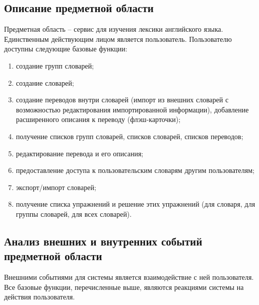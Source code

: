 \documentclass[a4paper,14pt]{extarticle}
\begin{document}
\subsection{Описание предметной области}
Предметная область -- сервис для изучения лексики английского языка.
Единственным действующим лицом является пользователь. Пользователю доступны
следующие базовые функции:
\begin{enumerate}
    \item создание групп словарей;
    \item создание словарей;
    \item создание переводов внутри словарей (импорт из внешних словарей с
          возможностью редактирования импортированной информации), добавление
          расширенного описания к переводу (флэш-карточки);
    \item получение списков групп словарей, списков словарей, списков переводов;
    \item редактирование перевода и его описания;
    \item предоставление доступа к пользовательским словарям другим пользователям;
    \item экспорт/импорт словарей;
    \item получение списка упражнений и решение этих упражнений (для словаря,
          для группы словарей, для всех словарей).
\end{enumerate}

\subsection{Анализ внешних и внутренних событий предметной области}
Внешними событиями для системы является взаимодействие с ней пользователя. Все
базовые функции, перечисленные выше, являются реакциями системы на действия
пользователя.
\end{document}
